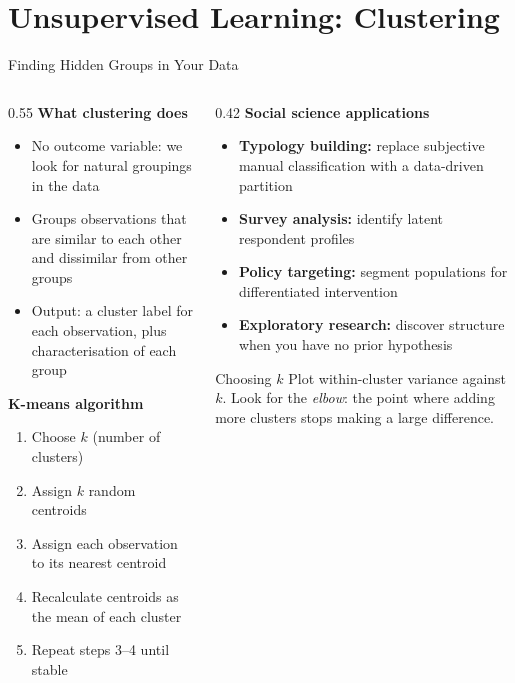 \documentclass[aspectratio=169, 10pt]{beamer}
\begin{document}
\section{Unsupervised Learning: Clustering}

\begin{frame}{Finding Hidden Groups in Your Data}
\begin{columns}[T]
\begin{column}{0.55\textwidth}
\textbf{What clustering does}
\begin{itemize}
  \setlength\itemsep{0.35em}
  \item No outcome variable: we look for natural groupings in the data
  \item Groups observations that are similar to each other and dissimilar from other groups
  \item Output: a cluster label for each observation, plus characterisation of each group
\end{itemize}

\vspace{0.5em}
\textbf{K-means algorithm}
\begin{enumerate}
  \setlength\itemsep{0.3em}
  \item Choose $k$ (number of clusters)
  \item Assign $k$ random centroids
  \item Assign each observation to its nearest centroid
  \item Recalculate centroids as the mean of each cluster
  \item Repeat steps 3--4 until stable
\end{enumerate}
\end{column}
\begin{column}{0.42\textwidth}
\textbf{Social science applications}
\vspace{0.4em}
\begin{itemize}
  \setlength\itemsep{0.35em}
  \item \textbf{Typology building:} replace subjective manual classification with a data-driven partition
  \item \textbf{Survey analysis:} identify latent respondent profiles
  \item \textbf{Policy targeting:} segment populations for differentiated intervention
  \item \textbf{Exploratory research:} discover structure when you have no prior hypothesis
\end{itemize}

\vspace{0.5em}
\begin{alertblock}{Choosing $k$}
Plot within-cluster variance against $k$. Look for the \textit{elbow}: the point where adding more clusters stops making a large difference.
\end{alertblock}
\end{column}
\end{columns}
\end{frame}
\end{document}
